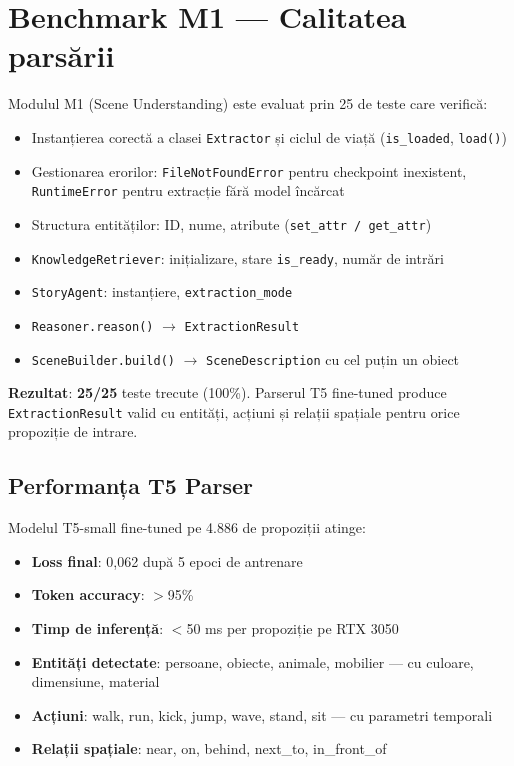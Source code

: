 \section{Benchmark M1 --- Calitatea parsării}
\label{sec:bench_m1}

Modulul M1 (Scene Understanding) este evaluat prin 25 de teste care verifică:

\begin{itemize}
    \item Instanțierea corectă a clasei \texttt{Extractor} și ciclul de viață (\texttt{is\_loaded}, \texttt{load()})
    \item Gestionarea erorilor: \texttt{FileNotFoundError} pentru checkpoint inexistent, \texttt{RuntimeError} pentru extracție fără model încărcat
    \item Structura entităților: ID, nume, atribute (\texttt{set\_attr / get\_attr})
    \item \texttt{KnowledgeRetriever}: inițializare, stare \texttt{is\_ready}, număr de intrări
    \item \texttt{StoryAgent}: instanțiere, \texttt{extraction\_mode}
    \item \texttt{Reasoner.reason()} $\rightarrow$ \texttt{ExtractionResult}
    \item \texttt{SceneBuilder.build()} $\rightarrow$ \texttt{SceneDescription} cu cel puțin un obiect
\end{itemize}

\textbf{Rezultat}: \textbf{25/25} teste trecute (100\%).  Parserul T5 fine-tuned produce \texttt{ExtractionResult} valid cu entități, acțiuni și relații spațiale pentru orice propoziție de intrare.

\subsection{Performanța T5 Parser}

Modelul T5-small fine-tuned pe 4.886 de propoziții atinge:
\begin{itemize}
    \item \textbf{Loss final}: 0,062 după 5 epoci de antrenare
    \item \textbf{Token accuracy}: $>$95\%
    \item \textbf{Timp de inferență}: $<$50 ms per propoziție pe RTX 3050
    \item \textbf{Entități detectate}: persoane, obiecte, animale, mobilier --- cu culoare, dimensiune, material
    \item \textbf{Acțiuni}: walk, run, kick, jump, wave, stand, sit --- cu parametri temporali
    \item \textbf{Relații spațiale}: near, on, behind, next\_to, in\_front\_of
\end{itemize}

